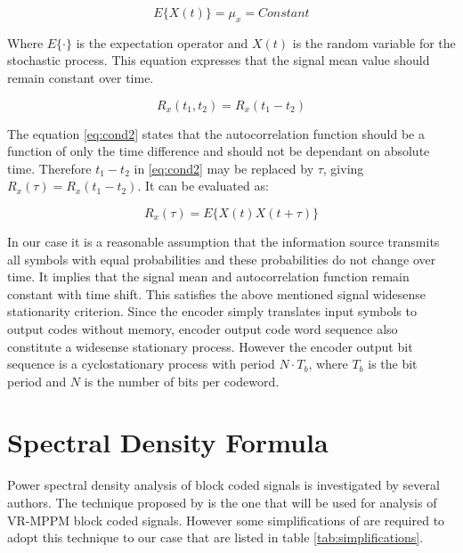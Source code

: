 \begin{equation}
	E\{X(t)\}=\mu_x = Constant
	\label{eq:cond1}
\end{equation}

Where $E\{\cdot\}$ is the expectation operator and $X(t)$ is the random variable for the stochastic process. This equation expresses that the signal mean value should remain constant over time.

\begin{equation}
	R_x(t_1,t_2)=R_x(t_1-t_2)
	\label{eq:cond2}
\end{equation}

The equation \ref{eq:cond2} states that the autocorrelation function should be a function of only the time difference and should not be dependant on absolute time. Therefore $t_1-t_2$ in \ref{eq:cond2} may be replaced by $\tau$, giving $R_x(\tau)=R_x(t_1-t_2)$. It can be evaluated as:

\begin{equation}
	R_x(\tau)=E\{X(t) X(t+\tau)\}
	\label{R_x_t1_t2}
\end{equation}

In our case it is a reasonable assumption that the information source transmits all symbols with equal probabilities and these probabilities do not change over time. It implies that the signal mean and autocorrelation function remain constant with time shift. This satisfies the above mentioned signal widesense stationarity criterion. Since the encoder simply translates input symbols to output codes without memory, encoder output code word sequence also constitute a widesense stationary process. However the encoder output bit sequence is a cyclostationary process \cite{cariolaro1974spectra} with period $N\cdot T_b$, where $T_b$ is the bit period and $N$ is the number of bits per codeword.
%

\section{Spectral Density Formula}
Power spectral density analysis of block coded signals is investigated by several authors. The technique proposed by \cite{cariolaro1974spectra} is the one that will be used for analysis of VR-MPPM block coded signals. However some simplifications of \cite{cariolaro1974spectra} are required to adopt this technique to our case that are listed in table \ref{tab:simplifications}.

